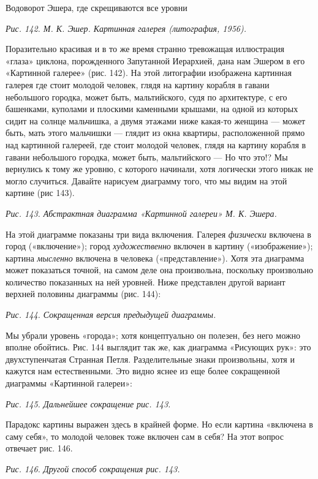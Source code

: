Водоворот Эшера, где скрещиваются все уровни

\emph{Рис. 142. М. К. Эшер. Картинная галерея (литография, 1956).}

Поразительно красивая и в то же время странно тревожащая иллюстрация «глаза» циклона, порожденного Запутанной Иерархией, дана нам Эшером в его «Картинной галерее» (рис. 142). На этой литографии изображена картинная галерея где стоит молодой человек, глядя на картину корабля в гавани небольшого городка, может быть, мальтийского, судя по архитектуре, с его башенками, куполами и плоскими каменными крышами, на одной из которых сидит на солнце мальчишка, а двумя этажами ниже какая-то женщина --- может быть, мать этого мальчишки --- глядит из окна квартиры, расположенной прямо над картинной галереей, где стоит молодой человек, глядя на картину корабля в гавани небольшого городка, может быть, мальтийского --- Но что это!? Мы вернулись к тому же уровню, с которого начинали, хотя логически этого никак не могло случиться. Давайте нарисуем диаграмму того, что мы видим на этой картине (рис 143).

\emph{Рис. 143. Абстрактная диаграмма «Картинной галереи» М. К. Эшера.}

На этой диаграмме показаны три вида включения. Галерея \emph{физически} включена в город («включение»); город \emph{художественно} включен в картину («изображение»); картина \emph{мысленно} включена в человека («представление»). Хотя эта диаграмма может показаться точной, на самом деле она произвольна, поскольку произвольно количество показанных на ней уровней. Ниже представлен другой вариант верхней половины диаграммы (рис. 144):

\emph{Рис. 144. Сокращенная версия предыдущей диаграммы.}

Мы убрали уровень «города»; хотя концептуально он полезен, без него можно вполне обойтись. Рис. 144 выглядит так же, как диаграмма «Рисующих рук»: это двухступенчатая Странная Петля. Разделительные знаки произвольны, хотя и кажутся нам естественными. Это видно яснее из еще более сокращенной диаграммы «Картинной галереи»:

\emph{Рис. 145. Дальнейшее сокращение рис. 143.}

Парадокс картины выражен здесь в крайней форме. Но если картина «включена в саму себя», то молодой человек тоже включен сам в себя? На этот вопрос отвечает рис. 146.

\emph{Рис. 146. Другой способ сокращения рис. 143.}


